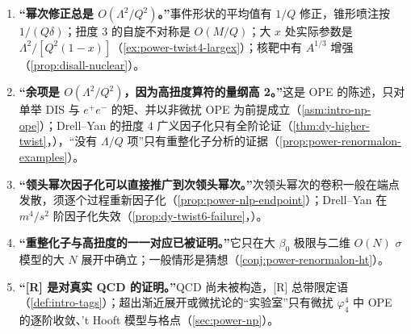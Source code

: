 \begin{tcolorbox}[enhanced,breakable,title=常见误解（本章）,fonttitle=\bfseries,
  colback=yellow!3!white,colframe=orange!60!black,boxrule=0.6pt,arc=2pt,
  left=5pt,right=5pt,top=3pt,bottom=3pt,before skip=6pt,after skip=6pt]
\begin{enumerate}[label=(\arabic*),leftmargin=1.6em,itemsep=0pt,topsep=1pt]
\item %
\textbf{“幂次修正总是 $O(\Lambda^2/Q^2)$。”}事件形状的平均值有 $1/Q$ 修正\cite{DokshitzerWebber1995}，锥形喷注按 $1/(Q\delta)$\cite{Korchemsky:1994is}；扭度 3 的自旋不对称是 $O(M/Q)$；大 $x$ 处实际参数是 $\Lambda^2/[Q^2(1-x)]$（\cref{ex:power-twist4-largex}）；核靶中有 $A^{1/3}$ 增强（\cref{prop:disall-nuclear}）。
\item %
\textbf{“余项是 $O(\Lambda^2/Q^2)$，因为高扭度算符的量纲高 2。”}这是 OPE 的陈述，只对单举 DIS 与 $e^+e^-$ 的矩、并以非微扰 OPE 为前提成立（\cref{asm:intro-np-ope}）；Drell--Yan 的扭度 4 广义因子化只有全阶论证（\cref{thm:dy-higher-twist}，\tagA），“没有 $\Lambda/Q$ 项”只有重整化子分析的证据（\cref{prop:power-renormalon-examples}）。
\item %
\textbf{“领头幂次因子化可以直接推广到次领头幂次。”}次领头幂次的卷积一般在端点发散，须逐个过程重新因子化（\cref{prop:power-nlp-endpoint}）；Drell--Yan 在 $m^4/s^2$ 阶因子化失效（\cref{prop:dy-twist6-failure}，\tagV）。
\item %
\textbf{“重整化子与高扭度的一一对应已被证明。”}它只在大 $\beta_0$ 极限与二维 $O(N)$ $\sigma$ 模型的大 $N$ 展开中确立；一般情形是猜想（\cref{conj:power-renormalon-ht}）。
\item %
\textbf{“[R] 是对真实 QCD 的证明。”}QCD 尚未被构造，[R] 总带限定语（\cref{def:intro-tags}）；超出渐近展开或微扰论的“实验室”只有微扰 $\varphi^4_4$ 中 OPE 的逐阶收敛、't Hooft 模型与格点（\cref{sec:power-np}）。
\end{enumerate}
\end{tcolorbox}
